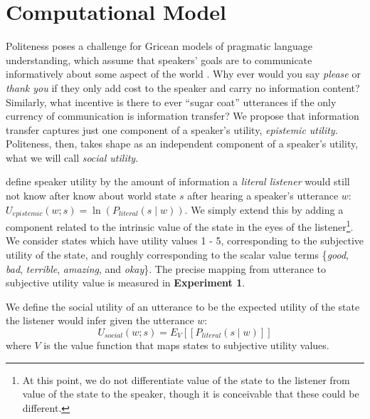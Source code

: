 \documentclass[10pt,letterpaper]{article}
\newcommand{\denote}[1]{\mbox{ $[\![ #1 ]\!]$}}
\begin{document}

\section{Computational Model}

Politeness poses a challenge for Gricean models of pragmatic language understanding, which assume that speakers' goals are to communicate informatively about some aspect of the world \cite{Frank2012, Goodman2013}. 
Why ever would you say \emph{please} or \emph{thank you} if they only add cost to the speaker and carry no information content?
Similarly, what incentive is there to ever ``sugar coat'' utterances if the only currency of communication is information transfer? 
We propose that information transfer captures just one component of a speaker's utility, \emph{epistemic utility}.
Politeness, then, takes shape as an independent component of a speaker's utility, what we will call \emph{social utility}. 

 define speaker utility by the amount of information a \emph{literal listener} would still not know after know about world state $s$ after hearing a speaker's utterance $w$: 
$U_{epistemic}(w; s) = \ln(P_{literal}(s \mid w)) $.
We simply extend this by adding a component related to the intrinsic value of the state in the eyes of the listener\footnote{At this point, we do not differentiate value of the state to the listener from value of the state to the speaker, though it is conceivable that these could be different.}.
We consider states which have utility values 1 - 5, corresponding to the subjective utility of the state, and roughly corresponding to the scalar value terms \{\emph{good}, \emph{bad}, \emph{terrible}, \emph{amazing}, and \emph{okay}\}. 
The precise mapping from utterance to subjective utility value is measured in \textbf{Experiment 1}.

We define the social utility of an utterance to be the expected utility of the state the listener would infer given the utterance $w$: 
%
$$
U_{social}(w; s) = E_{V}[[P_{literal}(s \mid w)]]
$$
%
where $V$ is the value function that maps states to subjective utility values. 

\end{document}
